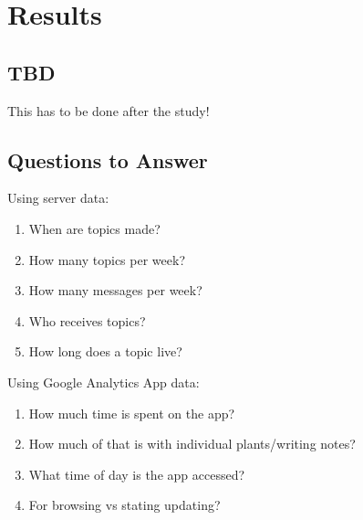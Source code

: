 \chapter{Results}
\section{TBD}
  This has to be done after the study!

\section{Questions to Answer}

  Using server data:
  \begin{enumerate}
    \item When are topics made?
    \item How many topics per week?
    \item How many messages per week?
    \item Who receives topics?
    \item How long does a topic live?
  \end{enumerate}

  Using Google Analytics App data:
  \begin{enumerate}
    \item How much time is spent on the app?
    \item How much of that is with individual plants/writing notes?
    \item What time of day is the app accessed?
    \item For browsing vs stating updating?
  \end{enumerate}

